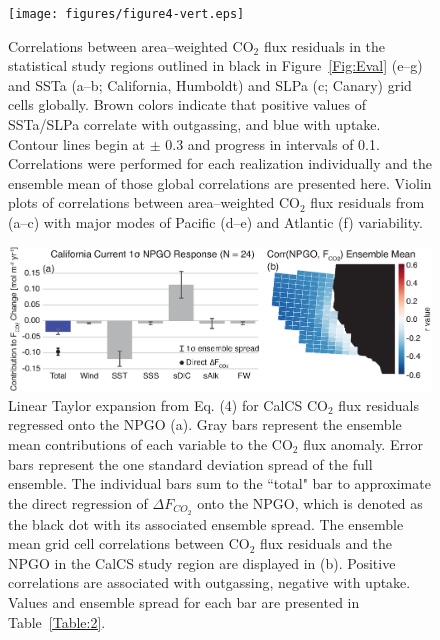 \documentclass[hvmath, online,bgd]{copernicus_discussions}
\begin{document}
\clearpage
\begin{figure}[t]
	\texttt{[image: figures/figure4-vert.eps]}
	\caption{Correlations between area--weighted CO$_{2}$ flux residuals in the statistical study regions outlined in black in Figure~\ref{Fig:Eval} (e--g) and SSTa (a--b; California, Humboldt) and SLPa (c; Canary) grid cells globally. Brown colors indicate that positive values of SSTa/SLPa correlate with outgassing, and blue with uptake. Contour lines begin at $\pm$ 0.3 and progress in intervals of 0.1. Correlations were performed for each realization individually and the ensemble mean of those global correlations are presented here. Violin plots of correlations between area--weighted CO$_{2}$ flux residuals from (a--c) with major modes of Pacific (d--e) and Atlantic (f) variability.}
	\label{Fig:GlobalRegressions}
\end{figure}

\clearpage
\begin{figure}[t]
	\includegraphics[width=12cm]{figures/figure5_notable.eps}
	\caption{Linear Taylor expansion from Eq. (4) for CalCS CO$_{2}$ flux residuals regressed onto the NPGO (a). Gray bars represent the ensemble mean contributions of each variable to the CO$_{2}$ flux anomaly. Error bars represent the one standard deviation spread of the full ensemble. The individual bars sum to the ``total" bar to approximate the direct regression of $\Delta F_{CO_{2}}$ onto the NPGO, which is denoted as the black dot with its associated ensemble spread. The ensemble mean grid cell correlations between CO$_{2}$ flux residuals and the NPGO in the CalCS study region are displayed in (b). Positive correlations are associated with outgassing, negative with uptake. Values and ensemble spread for each bar are presented in Table~\ref{Table:2}.}
	\label{Fig:CalDecompNPGO}
\end{figure}
\end{document}
